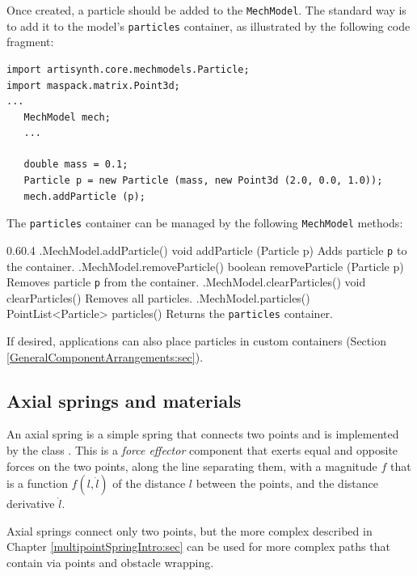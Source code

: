 Once created, a particle should be added to the {\tt MechModel}.  The standard
way is to add it to the model's {\tt particles} container, as illustrated by
the following code fragment:
%
\begin{lstlisting}[]
import artisynth.core.mechmodels.Particle;
import maspack.matrix.Point3d;
...
   MechModel mech; 
   ...

   double mass = 0.1;
   Particle p = new Particle (mass, new Point3d (2.0, 0.0, 1.0));
   mech.addParticle (p);
\end{lstlisting}
%

The {\tt particles} container can be managed by the following {\tt MechModel}
methods:
%
\begin{methodtable}{0.6}{0.4}
\midline
%
\methodentry
{\mech.MechModel.addParticle()}%
{void addParticle (Particle p)}%
{Adds particle {\tt p} to the container.}%
%
\methodentry
{\mech.MechModel.removeParticle()}%
{boolean removeParticle (Particle p)}%
{Removes particle {\tt p} from the container.}%
%
\methodentry
{\mech.MechModel.clearParticles()}%
{void clearParticles()}%
{Removes all particles.}%
%
\methodentry
{\mech.MechModel.particles()}%
{PointList<Particle> particles()}%
{Returns the {\tt particles} container.}%
%
\midline
\end{methodtable}
If desired, applications can also place particles in custom containers
(Section \ref{GeneralComponentArrangements:sec}).

\subsection{Axial springs and materials}
\label{AxialSprings:sec}

An axial spring is a simple spring that connects two points and is
implemented by the class
. This is a {\it
force effector} component that exerts equal and opposite forces on the
two points, along the line separating them, with a magnitude $f$ that
is a function $f(l, \dot l)$ of the distance $l$ between the points,
and the distance derivative $\dot l$.

\begin{sideblock}
Axial springs connect only two points, but the more
complex  described in
Chapter \ref{multipointSpringIntro:sec} can be used for more complex paths that
contain via points and obstacle wrapping.
\end{sideblock}


